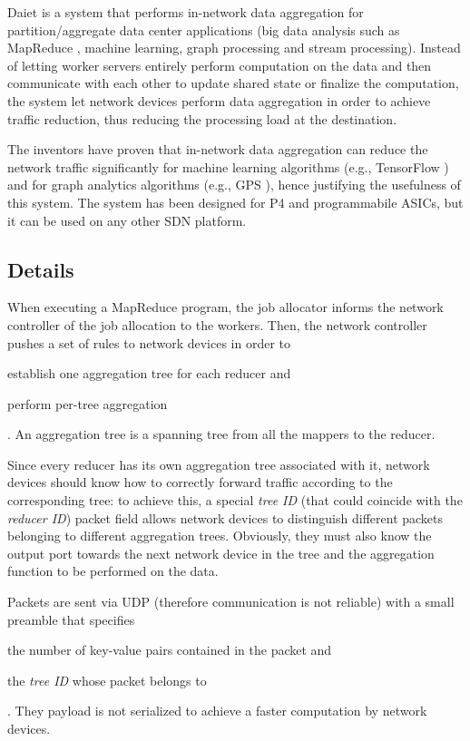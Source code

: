 Daiet \cite{daiet} is a system that performs in-network data aggregation for partition/aggregate data center applications (big data analysis such as MapReduce \cite{mapreduce}, machine learning, graph processing and stream processing).
Instead of letting worker servers entirely perform computation on the data and then communicate with each other to update shared state or finalize the computation, the system let network devices perform data aggregation in order to achieve traffic reduction, thus reducing the processing load at the destination.\par
The inventors have proven that in-network data aggregation can reduce the network traffic significantly for machine learning algorithms (e.g., TensorFlow \cite{tensorflow}) and for graph analytics algorithms (e.g., GPS \cite{gps}), hence justifying the usefulness of this system. The system has been designed for P4 and programmabile ASICs, but it can be used on any other SDN platform.

\subsection{Details}
When executing a MapReduce program, the job allocator informs the network controller of the job allocation to the workers.
Then, the network controller pushes a set of rules to network devices in order to
\begin{mylist}
    \item establish one aggregation tree for each reducer and
    \item perform per-tree aggregation
\end{mylist}.
An aggregation tree is a spanning tree from all the mappers to the reducer.\par
Since every reducer has its own aggregation tree associated with it, network devices should know how to correctly forward traffic according to the corresponding tree: to achieve this, a special \textit{tree ID} (that could coincide with the \textit{reducer ID}) packet field allows network devices to distinguish different packets belonging to different aggregation trees.
Obviously, they must also know the output port towards the next network device in the tree and the aggregation function to be performed on the data.\par
Packets are sent via UDP (therefore communication is not reliable) with a small preamble that specifies
\begin{mylist}
    \item the number of key-value pairs contained in the packet and
    \item the \textit{tree ID} whose packet belongs to
\end{mylist}. They payload is not serialized to achieve a faster computation by network devices.

